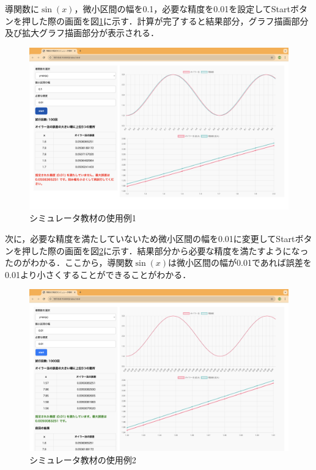 \documentclass[a4paper, 12pt]{ltjsarticle}
\begin{document}
\clearpage

導関数に$\sin(x)$，微小区間の幅を0.1，必要な精度を0.01を設定してStartボタンを押した際の画面を図\ref{fig:シミュレータ教材の使用例1}に示す．計算が完了すると結果部分，グラフ描画部分及び拡大グラフ描画部分が表示される．

\begin{figure}[h]
\begin{center}
\includegraphics[clip,width=\textwidth,keepaspectratio]{sim-sample2.png}
\end{center}
\caption{シミュレータ教材の使用例1}
\label{fig:シミュレータ教材の使用例1}
\end{figure}

\clearpage

次に，必要な精度を満たしていないため微小区間の幅を0.01に変更してStartボタンを押した際の画面を図\ref{fig:シミュレータ教材の使用例2}に示す．結果部分から必要な精度を満たすようになったのがわかる．ここから，導関数$\sin(x)$は微小区間の幅が0.01であれば誤差を0.01より小さくすることができることがわかる．

\begin{figure}[h]
\begin{center}
\includegraphics[clip,width=\textwidth,keepaspectratio]{sim-sample3.png}
\end{center}
\caption{シミュレータ教材の使用例2}
\label{fig:シミュレータ教材の使用例2}
\end{figure}
\end{document}
